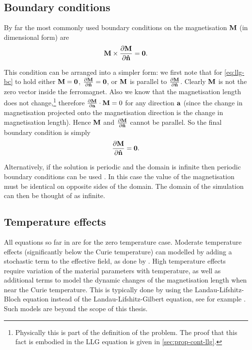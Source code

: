 \subsection{Boundary conditions}
\label{sec:magn-bound-cond}

By far the most commonly used boundary conditions on the magnetisation $\boldsymbol{\mathrm{M}}$ (in dimensional form) are \cite[178, 181]{Aharoni1996}
\begin{equation}
  \label{eq:llg-bc}
  \boldsymbol{\mathrm{M}} \times \frac{\partial \boldsymbol{\mathrm{M}}}{\partial \boldsymbol{\mathrm{\hat{n}}}} = \mathbf{0}.
\end{equation}

This condition can be arranged into a simpler form: we first note that for \cref{eq:llg-bc} to hold either $\boldsymbol{\mathrm{M}} = \mathbf{0}$, $\frac{\partial \boldsymbol{\mathrm{M}}}{\partial \boldsymbol{\mathrm{\hat{n}}}} = \mathbf{0}$, or $\boldsymbol{\mathrm{M}}$ is parallel to $\frac{\partial \boldsymbol{\mathrm{M}}}{\partial \boldsymbol{\mathrm{\hat{n}}}}$.
Clearly $\boldsymbol{\mathrm{M}}$ is not the zero vector inside the ferromagnet.
Also we know that the magnetisation length does not change,\footnote{Physically this is part of the definition of the problem. The proof that this fact is embodied in the LLG equation is given in \cref{sec:prop-cont-llg}.} therefore $\frac{\partial \boldsymbol{\mathrm{M}}}{\partial {\boldsymbol{\mathrm{a}}}} \cdot \boldsymbol{\mathrm{M}} = 0$ for any direction ${\boldsymbol{\mathrm{a}}}$ (since the change in magnetisation projected onto the magnetisation direction is the change in magnetisation length).
Hence $\boldsymbol{\mathrm{M}}$ and $\frac{\partial \boldsymbol{\mathrm{M}}}{\partial \boldsymbol{\mathrm{\hat{n}}}}$ cannot be parallel.
So the final boundary condition is simply
\begin{equation}
  \label{eq:94}
  \frac{\partial \boldsymbol{\mathrm{M}}}{\partial \boldsymbol{\mathrm{\hat{n}}}} = \mathbf{0}.
\end{equation}

Alternatively, if the solution is periodic and the domain is infinite then periodic boundary conditions can be used \cite{Jeong2010}.
In this case the value of the magnetisation must be identical on opposite sides of the domain.
The domain of the simulation can then be thought of as infinite.

\subsection{Temperature effects}
\label{sec:temperature-effects}
All equations so far in  are for the zero temperature case.
Moderate temperature effects (significantly below the Curie temperature) can modelled by adding a stochastic term to the effective field, as done by \eg \cite{DAquino2006}.
High temperature effects require variation of the material parameters with temperature, as well as additional terms to model the dynamic changes of the magnetisation length when near the Curie temperature.
This is typically done by using the Landau-Lifshitz-Bloch equation instead of the Landau-Lifshitz-Gilbert equation, see for example \cite{Evans2012}.
Such models are beyond the scope of this thesis.


